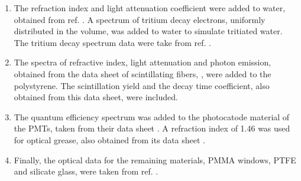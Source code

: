 \begin{enumerate}
%
\item{} The refraction index and light attenuation coefficient were added to water, obtained from ref. \cite{WaterPropertiesSimulation}. A spectrum of tritium decay electrons, uniformly distributed in the volume, was added to water to simulate tritiated water. The tritium decay spectrum data were take from ref. \cite{TritiumEmissionSpectrum}.

\item{} The spectra of refractive index, light attenuation and photon emission, obtained from the data sheet of scintillating fibers, \cite{DataSheetBCF12Fiber}, were added to the polystyrene. The scintillation yield and the decay time coefficient, also obtained from this data sheet, were included.

\item{} The quantum efficiency spectrum was added to the photocatode material of the PMTs, taken from their data sheet \cite{DataSheetPMTs}. A refraction index of 1.46 was used for optical grease, also obtained from its data sheet \cite{OpticalGrease}.

\item{} Finally, the optical data for the remaining materials, PMMA windows, PTFE and silicate glass, were taken from ref. \cite{NEMODataSimulation}.

\end{enumerate} 